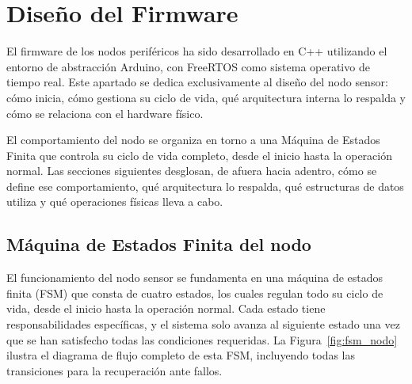 
\section{Diseño del Firmware}

El firmware de los nodos periféricos ha sido desarrollado en C++ utilizando el entorno de abstracción Arduino, con FreeRTOS como sistema operativo de tiempo real. Este apartado se dedica exclusivamente al diseño del nodo sensor: cómo inicia, cómo gestiona su ciclo de vida, qué arquitectura interna lo respalda y cómo se relaciona con el hardware físico.

El comportamiento del nodo se organiza en torno a una Máquina de Estados Finita que controla su ciclo de vida completo, desde el inicio hasta la operación normal. Las secciones siguientes desglosan, de afuera hacia adentro, cómo se define ese comportamiento, qué arquitectura lo respalda, qué estructuras de datos utiliza y qué operaciones físicas lleva a cabo.

\subsection{Máquina de Estados Finita del nodo}

El funcionamiento del nodo sensor se fundamenta en una máquina de estados finita (FSM) que consta de cuatro estados, los cuales regulan todo su ciclo de vida, desde el inicio hasta la operación normal. Cada estado tiene responsabilidades específicas, y el sistema solo avanza al siguiente estado una vez que se han satisfecho todas las condiciones requeridas. La Figura~\ref{fig:fsm_nodo} ilustra el diagrama de flujo completo de esta FSM, incluyendo todas las transiciones para la recuperación ante fallos.


